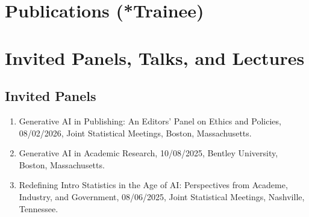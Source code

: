 \documentclass[Statistics]{vita}
\begin{document}
\begin{vita}
\section{Publications (*Trainee)}
  
  \section{Invited Panels, Talks, and Lectures}
  \subsection{Invited Panels}
  \begin{enumerate}
  \item Generative AI in Publishing: An Editors' Panel on Ethics and Policies, 08/02/2026, Joint Statistical Meetings, Boston, Massachusetts.
  \item Generative AI in Academic Research, 10/08/2025, Bentley University, Boston, Massachusetts.
  \item Redefining Intro Statistics in the Age of AI: Perspectives from Academe, Industry, and Government, 08/06/2025, Joint Statistical Meetings, Nashville, Tennessee.
  \end{enumerate}

\end{vita}
\end{document}
